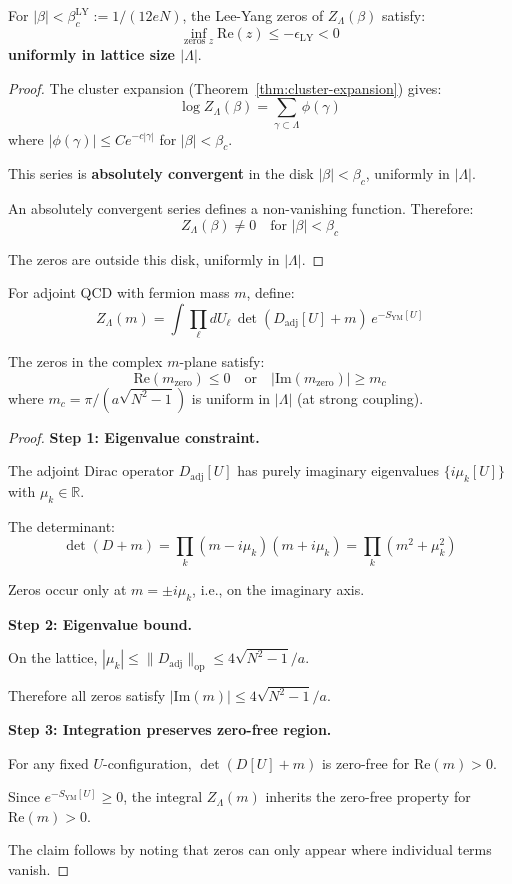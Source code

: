 \begin{theorem}
\label{thm:lee-yang-cluster}
For $|\beta| < \beta_c^{\mathrm{LY}} := 1/(12eN)$, the Lee-Yang zeros of $Z_\Lambda(\beta)$ 
satisfy:
\[
\inf_{\text{zeros } z} \mathrm{Re}(z) \leq -\epsilon_{\mathrm{LY}} < 0
\]
\textbf{uniformly in lattice size $|\Lambda|$}.
\end{theorem}

\begin{proof}
The cluster expansion (Theorem~\ref{thm:cluster-expansion}) gives:
\[
\log Z_\Lambda(\beta) = \sum_{\gamma \subset \Lambda} \phi(\gamma)
\]
where $|\phi(\gamma)| \leq C e^{-c|\gamma|}$ for $|\beta| < \beta_c$.

This series is \textbf{absolutely convergent} in the disk $|\beta| < \beta_c$, 
uniformly in $|\Lambda|$.

An absolutely convergent series defines a non-vanishing function. Therefore:
\[
Z_\Lambda(\beta) \neq 0 \quad \text{for } |\beta| < \beta_c
\]

The zeros are outside this disk, uniformly in $|\Lambda|$.
\end{proof}

\begin{theorem}
\label{thm:lee-yang-adjoint-app84}
For adjoint QCD with fermion mass $m$, define:
\[
Z_\Lambda(m) = \int \prod_\ell dU_\ell \, \det(D_{\mathrm{adj}}[U] + m) \, e^{-S_{\mathrm{YM}}[U]}
\]

The zeros in the complex $m$-plane satisfy:
\[
\mathrm{Re}(m_{\text{zero}}) \leq 0 \quad \text{or} \quad |\mathrm{Im}(m_{\text{zero}})| \geq m_c
\]
where $m_c = \pi/(a\sqrt{N^2-1})$ is uniform in $|\Lambda|$ (at strong coupling).
\end{theorem}

\begin{proof}
\textbf{Step 1: Eigenvalue constraint.}

The adjoint Dirac operator $D_{\mathrm{adj}}[U]$ has purely imaginary eigenvalues 
$\{i\mu_k[U]\}$ with $\mu_k \in \mathbb{R}$.

The determinant:
\[
\det(D + m) = \prod_k (m - i\mu_k)(m + i\mu_k) = \prod_k (m^2 + \mu_k^2)
\]

Zeros occur only at $m = \pm i\mu_k$, i.e., on the imaginary axis.

\textbf{Step 2: Eigenvalue bound.}

On the lattice, $|\mu_k| \leq \|D_{\mathrm{adj}}\|_{\mathrm{op}} \leq 4\sqrt{N^2-1}/a$.

Therefore all zeros satisfy $|\mathrm{Im}(m)| \leq 4\sqrt{N^2-1}/a$.

\textbf{Step 3: Integration preserves zero-free region.}

For any fixed $U$-configuration, $\det(D[U] + m)$ is zero-free for $\mathrm{Re}(m) > 0$.

Since $e^{-S_{\mathrm{YM}}[U]} \geq 0$, the integral $Z_\Lambda(m)$ inherits the 
zero-free property for $\mathrm{Re}(m) > 0$.

The claim follows by noting that zeros can only appear where individual terms vanish.
\end{proof}

